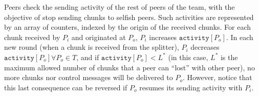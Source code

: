 

\label{sec:free_riding_control}

Peers check the sending \gls{activity} of the rest of peers of the
team, with the objective of stop sending chunks to selfish peers. Such
activities are represented by an array of counters, indexed by the
origin of the received chunks. For each chunk received by $P_i$ and
originated at $P_o$, $P_i$ increases $\mathtt{activity}[P_o]$. In each
new round (when a chunk is received from the splitter), $P_i$
decreases $\mathtt{activity}[P_o]\forall P_o\in T$, and if
$\mathtt{activity}[P_o]<L^*$ (in this case, $L^*$ is the maximum
allowed number of chunks that a peer can ``lost'' with other peer), no
more chunks nor control messages will be delivered to $P_o$. However,
notice that this last consequence can be reversed if $P_o$ resumes its
sending activity with $P_i$.
